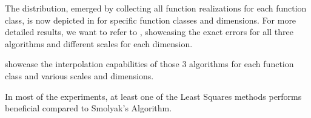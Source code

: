 \documentclass[12pt, oneside]{amsart}
\theoremstyle{definition}
\theoremstyle{remark}
\numberwithin{equation}{section}
\begin{document}
The distribution, emerged by collecting all function realizations for each 
function class, is now depicted in 
 for specific 
function classes and dimensions. For more detailed results, we want to refer to 
, showcasing the exact errors 
for all three algorithms and different scales for each dimension.


 showcase the interpolation 
capabilities of those 3 algorithms for each function class and various scales 
and dimensions. 




In most of the experiments, at least one of the Least Squares methods 
performs beneficial compared to Smolyak's Algorithm. 




\end{document}
